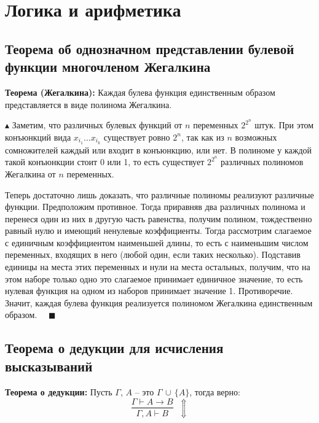 \section{Логика и арифметика}

\subsection{Теорема об однозначном представлении булевой функции многочленом Жегалкина}
\textbf{Теорема (Жегалкина):} Каждая булева функция единственным образом представляется в виде полинома Жегалкина.

$\blacktriangle$ Заметим, что различных булевых функций от $n$ переменных $2^{2^n}$ штук. При этом конъюнкций вида $x_{i_1}\ldots x_{i_k}$ существует ровно $2^n$, так как из $n$ возможных сомножителей каждый или входит в конъюнкцию, или нет. В полиноме у каждой такой конъюнкции стоит 0 или 1, то есть существует $2^{2^n}$ различных полиномов Жегалкина от $n$ переменных.

Теперь достаточно лишь доказать, что различные полиномы реализуют различные функции. Предположим противное. Тогда приравняв два различных полинома и перенеся один из них в другую часть равенства, получим полином, тождественно равный нулю и имеющий ненулевые коэффициенты. Тогда рассмотрим слагаемое с единичным коэффициентом наименьшей длины, то есть с наименьшим числом переменных, входящих в него (любой один, если таких несколько). Подставив единицы на места этих переменных и нули на места остальных, получим, что на этом наборе только одно это слагаемое принимает единичное значение, то есть нулевая функция на одном из наборов принимает значение 1. Противоречие. Значит, каждая булева функция реализуется полиномом Жегалкина единственным образом. $\quad \blacksquare$ 

\subsection{Теорема о дедукции для исчисления высказываний}

\textbf{Теорема о дедукции:} Пусть $\Gamma$, $A$ -- это $\Gamma \,\cup\, \{A\}$, тогда верно:
$$\frac{\Gamma\vdash A\to B}{\Gamma,A\vdash B}\;\;\Updownarrow$$

